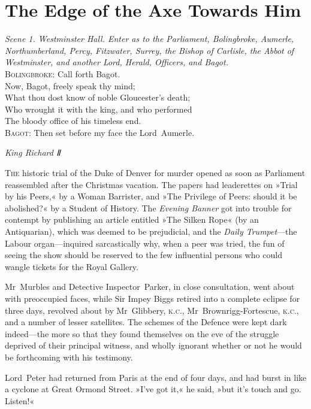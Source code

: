 

\chapter{The Edge of the Axe Towards Him}

\epigraph{
\textit{Scene 1. Westminster Hall. Enter as to the Parliament, Bolingbroke, Aumerle, Northumberland, Percy, Fitzwater, Surrey, the Bishop of Carlisle, the Abbot of Westminster, and another Lord, Herald, Officers, and Bagot.}\\
\textsc{Bolingbroke}: Call forth Bagot.\\
\indent Now, Bagot, freely speak thy mind;\\
\indent What thou dost know of noble Gloucester's death;\\
\indent Who wrought it with the king, and who performed\\
The bloody office of his timeless end.\\
\textsc{Bagot}: Then set before my face the Lord~Aumerle.}{\textit{King Richard Ⅱ}}


\lettrine[lines=4]{T}{he} historic trial of the Duke of Denver for murder opened as soon as Parliament reassembled after the Christmas vacation. The papers had leaderettes on »Trial by his Peers,« by a Woman Barrister, and »The Privilege of Peers: should it be abolished?« by a Student of History.  The \textit{Evening Banner} got into trouble for contempt by publishing an article entitled »The Silken Rope« (by an Antiquarian), which was deemed to be prejudicial, and the \textit{Daily Trumpet}—the Labour organ—inquired sarcastically why, when a peer was tried, the fun of seeing the show should be reserved to the few influential persons who could wangle tickets for the Royal Gallery.

Mr~Murbles and Detective Inspector~Parker, in close consultation, went about with preoccupied faces, while Sir Impey Biggs retired into a complete eclipse for three days, revolved about by Mr~Glibbery, \textsc{k.c.}, Mr~Brownrigg-Fortescue, \textsc{k.c.}, and a number of lesser satellites. The schemes of the Defence were kept dark indeed—the more so that they found themselves on the eve of the struggle deprived of their principal witness, and wholly ignorant whether or not he would be forthcoming with his testimony.

Lord~Peter had returned from Paris at the end of four days, and had burst in like a cyclone at Great Ormond Street. »I've got it,« he said, »but it's touch and go. Listen!«

